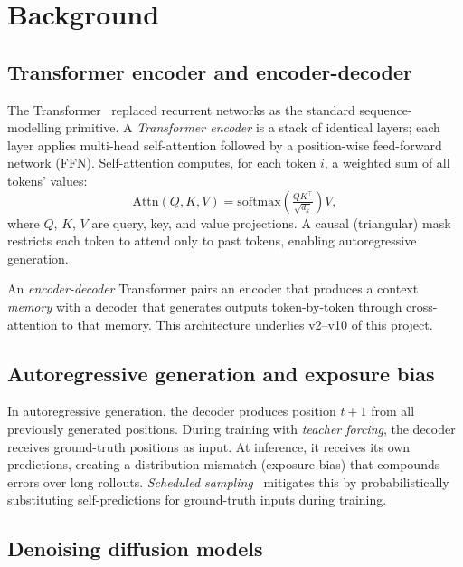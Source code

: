 \documentclass[11pt,a4paper]{article}
\begin{document}
\section{Background}
\label{sec:background}

\subsection{Transformer encoder and encoder-decoder}
\label{sec:bg-transformer}

The Transformer~\cite{vaswani2017attention} replaced recurrent networks as the
standard sequence-modelling primitive.
A \emph{Transformer encoder} is a stack of identical layers; each layer applies
multi-head self-attention followed by a position-wise feed-forward network (FFN).
Self-attention computes, for each token $i$, a weighted sum of all tokens' values:
\[
  \text{Attn}(Q,K,V) = \text{softmax}\!\left(\tfrac{QK^\top}{\sqrt{d_k}}\right)V,
\]
where $Q$, $K$, $V$ are query, key, and value projections.
A causal (triangular) mask restricts each token to attend only to past tokens,
enabling autoregressive generation.

An \emph{encoder-decoder} Transformer pairs an encoder that produces a context
\emph{memory} with a decoder that generates outputs token-by-token through
cross-attention to that memory.
This architecture underlies v2--v10 of this project.

\subsection{Autoregressive generation and exposure bias}

In autoregressive generation, the decoder produces position $t+1$ from all
previously generated positions.
During training with \emph{teacher forcing}, the decoder receives ground-truth
positions as input.
At inference, it receives its own predictions, creating a distribution mismatch
(exposure bias) that compounds errors over long rollouts.
\emph{Scheduled sampling}~\cite{bengio2015scheduled} mitigates this by
probabilistically substituting self-predictions for ground-truth inputs during
training.

\subsection{Denoising diffusion models}
\label{sec:bg-diffusion}
\end{document}
